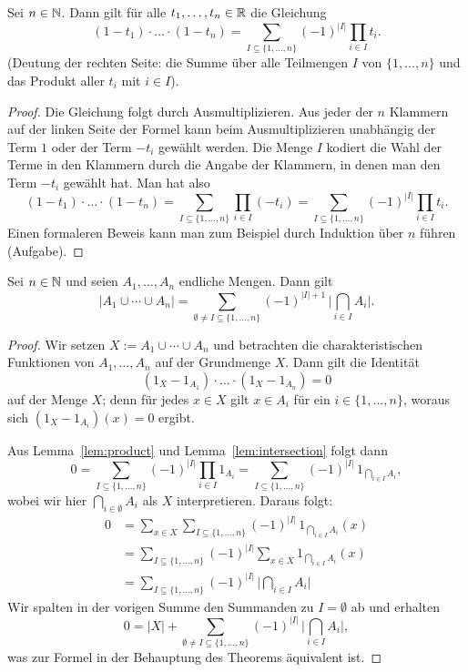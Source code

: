 \begin{lem} \label{lem:product} 
	Sei $n \in \mathbb{N}$. Dann gilt für alle $t_1,\ldots,t_n \in \mathbb{R}$ die Gleichung 
	\[
		(1 - t_1) \cdot \ldots \cdot  (1-t_n) = \sum_{I \subseteq \{1,\ldots,n\}} (-1)^{|I|} \prod_{i \in I} t_i.  
	\]
	(Deutung der rechten Seite: die Summe über alle Teilmengen $I$ von $\{1,\ldots,n\}$ und das Produkt aller $t_i$ mit $i \in I$). 
\end{lem} 
\begin{proof} 
	Die Gleichung folgt durch Ausmultiplizieren. Aus jeder der $n$ Klammern auf der linken Seite der Formel kann beim Ausmultiplizieren unabhängig der Term $1$ oder der Term $-t_i$ gewählt werden. Die Menge $I$ kodiert die Wahl der Terme in den Klammern durch die Angabe der Klammern, in denen man den Term $-t_i$ gewählt hat. Man hat also 
	\[
			(1 - t_1) \cdot \ldots \cdot  (1-t_n) = \sum_{I \subseteq \{1,\ldots,n\}}  \prod_{i \in I} (-t_i)  = \sum_{I \subseteq \{1,\ldots,n\}} (-1)^{|I|} \prod_{i \in I} t_i.
	\]
	Einen formaleren Beweis kann man zum Beispiel durch Induktion über $n$ führen (Aufgabe). 
\end{proof} 

\begin{thm} \label{thm:ink:exkl}
	Sei $n \in \mathbb{N}$ und seien $A_1,\ldots,A_n$ endliche Mengen. Dann gilt 
	\[
		| A_1 \cup \cdots \cup A_n| = \sum_{\emptyset \ne I \subseteq \{1,\ldots,n\}} (-1)^{|I|+1} \,\Big| \bigcap_{i \in I} A_i \Big| .
	\]
\end{thm} 
\begin{proof} 
	Wir setzen $X := A_1 \cup \cdots \cup A_n$ und betrachten die charakteristischen Funktionen von $A_1,\ldots,A_n$ auf der Grundmenge $X$. Dann gilt die Identität
	\[
		  (1_X - 1_{A_1} ) \cdot \ldots \cdot (1_X - 1_{A_n}) = 0
	\]
	auf der Menge $X$; denn für jedes $x \in X$ gilt $x \in A_i$ für ein $i \in \{1,\ldots,n\}$, woraus sich $(1_X - 1_{A_i})(x) = 0$ ergibt. 
	
	Aus Lemma~\ref{lem:product} und Lemma~\ref{lem:intersection} folgt dann 
	\[
		 0 = \sum_{I \subseteq \{1,\ldots,n\}} (-1)^{|I|} \prod_{i \in I} 1_{A_i} = \sum_{I \subseteq \{1,\ldots,n\}} (-1)^{|I| } \, 1_{\bigcap_{i \in I} A_i},
	\]
	wobei wir hier $\bigcap_{i \in \emptyset} A_i$ als $X$ interpretieren. 
	Daraus folgt: 
	\begin{align*}
		0  & = \sum_{x \in X} \sum_{I \subseteq \{1,\ldots,n\}} (-1)^{|I| } \, 1_{\bigcap_{i \in I} A_i}(x)
		\\ & = \sum_{I \subseteq \{1,\ldots,n\} } (-1)^{|I| } \sum_{x \in X} 1_{\bigcap_{i \in I} A_i}(x)
		\\ & = \sum_{I \subseteq \{1,\ldots,n\}} (-1)^{|I| } \,\Big| \bigcap_{i \in I} A_i \Big|
	\end{align*}
	Wir spalten in der vorigen Summe den Summanden zu $I = \emptyset$ ab und erhalten 
	\[
		0  = |X| + \sum_{\emptyset \ne I \subseteq \{1,\ldots,n\}} (-1)^{|I| } \,\Big| \bigcap_{i \in I} A_i \Big|,
	\]
	was zur Formel in der Behauptung des Theorems äquivalent ist. 
\end{proof} 

